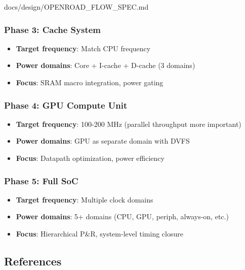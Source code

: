 \begin{relocated}{docs/design/OPENROAD_FLOW_SPEC.md}
\subsubsection{Phase 3: Cache System}\label{tm:pd:openroad-flow:phase-3-cache-system}

\begin{itemize}
\tightlist
\item
  \textbf{Target frequency}: Match CPU frequency
\item
  \textbf{Power domains}: Core + I-cache + D-cache (3 domains)
\item
  \textbf{Focus}: SRAM macro integration, power gating
\end{itemize}

\subsubsection{Phase 4: GPU Compute Unit}\label{tm:pd:openroad-flow:phase-4-gpu-compute-unit}

\begin{itemize}
\tightlist
\item
  \textbf{Target frequency}: 100-200 MHz (parallel throughput more
  important)
\item
  \textbf{Power domains}: GPU as separate domain with DVFS
\item
  \textbf{Focus}: Datapath optimization, power efficiency
\end{itemize}

\subsubsection{Phase 5: Full SoC}\label{tm:pd:openroad-flow:phase-5-full-soc}

\begin{itemize}
\tightlist
\item
  \textbf{Target frequency}: Multiple clock domains
\item
  \textbf{Power domains}: 5+ domains (CPU, GPU, periph, always-on, etc.)
\item
  \textbf{Focus}: Hierarchical P\&R, system-level timing closure
\end{itemize}

\subsection{References}\label{tm:pd:openroad-flow:references}


\end{relocated}
